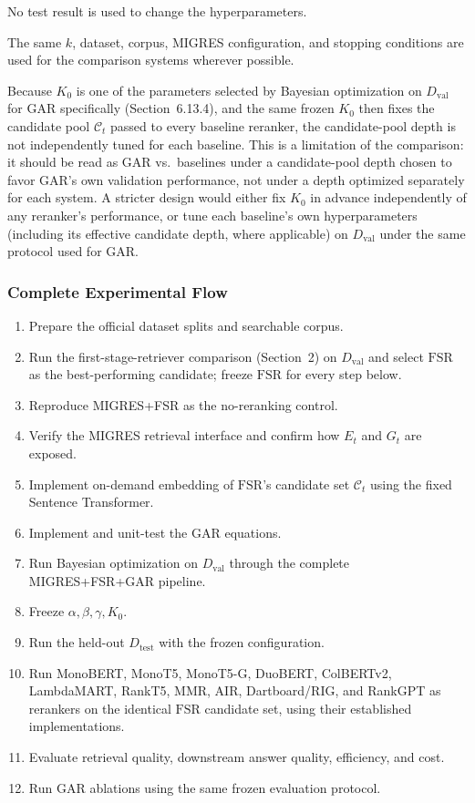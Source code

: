 \documentclass[11pt,a4paper]{article}
\begin{document}
No test result is used to change the hyperparameters.

The same $k$, dataset, corpus, MIGRES configuration, and stopping conditions are used for the comparison systems wherever possible.

Because $K_0$ is one of the parameters selected by Bayesian optimization on $D_{\mathrm{val}}$ for GAR specifically (Section~6.13.4), and the same frozen $K_0$ then fixes the candidate pool $\mathcal{C}_t$ passed to every baseline reranker, the candidate-pool depth is not independently tuned for each baseline. This is a limitation of the comparison: it should be read as GAR vs.\ baselines under a candidate-pool depth chosen to favor GAR's own validation performance, not under a depth optimized separately for each system. A stricter design would either fix $K_0$ in advance independently of any reranker's performance, or tune each baseline's own hyperparameters (including its effective candidate depth, where applicable) on $D_{\mathrm{val}}$ under the same protocol used for GAR.

\subsubsection{Complete Experimental Flow}

\begin{enumerate}[leftmargin=1.5em]
\item Prepare the official dataset splits and searchable corpus.
\item Run the first-stage-retriever comparison (Section~2) on $D_{\mathrm{val}}$ and select $\mathrm{FSR}$ as the best-performing candidate; freeze $\mathrm{FSR}$ for every step below.
\item Reproduce MIGRES+FSR as the no-reranking control.
\item Verify the MIGRES retrieval interface and confirm how $E_t$ and $G_t$ are exposed.
\item Implement on-demand embedding of $\mathrm{FSR}$'s candidate set $\mathcal{C}_t$ using the fixed Sentence Transformer.
\item Implement and unit-test the GAR equations.
\item Run Bayesian optimization on $D_{\mathrm{val}}$ through the complete MIGRES+FSR+GAR pipeline.
\item Freeze $\alpha,\beta,\gamma,K_0$.
\item Run the held-out $D_{\mathrm{test}}$ with the frozen configuration.
\item Run MonoBERT, MonoT5, MonoT5-G, DuoBERT, ColBERTv2, LambdaMART, RankT5, MMR, AIR, Dartboard/RIG, and RankGPT as rerankers on the identical $\mathrm{FSR}$ candidate set, using their established implementations.
\item Evaluate retrieval quality, downstream answer quality, efficiency, and cost.
\item Run GAR ablations using the same frozen evaluation protocol.
\end{enumerate}
\end{document}
